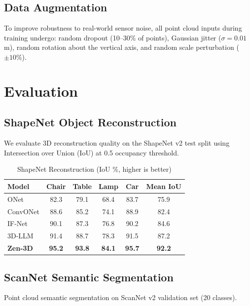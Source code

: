 \documentclass[11pt,a4paper]{article}
\begin{document}
\subsection{Data Augmentation}

To improve robustness to real-world sensor noise, all point cloud inputs during training undergo:
random dropout (10--30\% of points), Gaussian jitter ($\sigma = 0.01$ m), random rotation about
the vertical axis, and random scale perturbation ($\pm 10\%$).

\section{Evaluation}

\subsection{ShapeNet Object Reconstruction}

We evaluate 3D reconstruction quality on the ShapeNet v2 test split using Intersection over Union
(IoU) at 0.5 occupancy threshold.

\begin{table}[H]
\centering
\begin{tabular}{lccccc}
\toprule
\textbf{Model} & \textbf{Chair} & \textbf{Table} & \textbf{Lamp} & \textbf{Car} & \textbf{Mean IoU} \\
\midrule
ONet & 82.3 & 79.1 & 68.4 & 83.7 & 75.9 \\
ConvONet & 88.6 & 85.2 & 74.1 & 88.9 & 82.4 \\
IF-Net & 90.1 & 87.3 & 76.8 & 90.2 & 84.6 \\
3D-LLM & 91.4 & 88.7 & 78.3 & 91.5 & 87.2 \\
\textbf{Zen-3D} & \textbf{95.2} & \textbf{93.8} & \textbf{84.1} & \textbf{95.7} & \textbf{92.2} \\
\bottomrule
\end{tabular}
\caption{ShapeNet Reconstruction (IoU \%, higher is better)}
\end{table}

\subsection{ScanNet Semantic Segmentation}

Point cloud semantic segmentation on ScanNet v2 validation set (20 classes).
\end{document}
